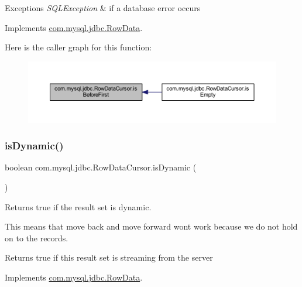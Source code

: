 \begin{DoxyExceptions}{Exceptions}
{\em S\+Q\+L\+Exception} & if a database error occurs \\
\hline
\end{DoxyExceptions}


Implements \mbox{\hyperlink{interfacecom_1_1mysql_1_1jdbc_1_1_row_data_ae315d5317b29387492173d1e808b65d5}{com.\+mysql.\+jdbc.\+Row\+Data}}.

Here is the caller graph for this function\+:
\nopagebreak
\begin{figure}[H]
\begin{center}
\leavevmode
\includegraphics[width=350pt]{classcom_1_1mysql_1_1jdbc_1_1_row_data_cursor_a1c63929717c789969a16960cc340bdad_icgraph}
\end{center}
\end{figure}
\mbox{\label{classcom_1_1mysql_1_1jdbc_1_1_row_data_cursor_a181d924b1f4a28875db321305489f179}} 
\subsubsection{\texorpdfstring{is\+Dynamic()}{isDynamic()}}
{\footnotesize\ttfamily boolean com.\+mysql.\+jdbc.\+Row\+Data\+Cursor.\+is\+Dynamic (\begin{DoxyParamCaption}{ }\end{DoxyParamCaption})}

Returns true if the result set is dynamic.

This means that move back and move forward won\textquotesingle{}t work because we do not hold on to the records.

\begin{DoxyReturn}{Returns}
true if this result set is streaming from the server 
\end{DoxyReturn}


Implements \mbox{\hyperlink{interfacecom_1_1mysql_1_1jdbc_1_1_row_data_a0205c4297c795afb968d714a56272e01}{com.\+mysql.\+jdbc.\+Row\+Data}}.

